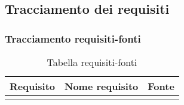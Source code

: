 \subsection{Tracciamento dei requisiti}\label{subsec:tracciamento}
\subsubsection{Tracciamento requisiti-fonti}
\begin{xltabular}{\textwidth}{ p{0.2\textwidth} | X | p{0.2\textwidth} }
    \textbf{\color{white} Requisito} & \textbf{\color{white} Nome requisito} & \textbf{\color{white} Fonte} \\ 
    \endhead

    \caption{Tabella requisiti-fonti}
    \endlastfoot


\end{xltabular}
